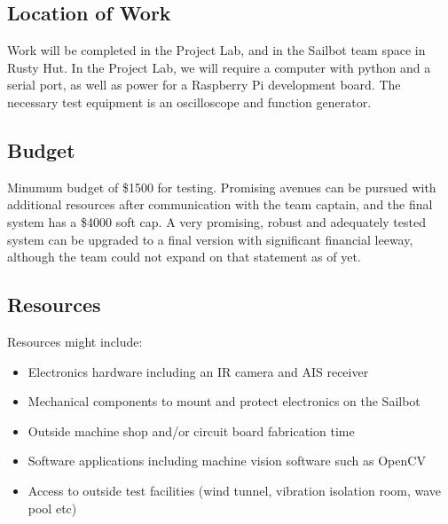 \subsection{\label{sec:resources:location-of-work}Location of Work}
Work will be completed in the Project Lab, and in the Sailbot team space in Rusty Hut. In the Project Lab, we will require a computer with python and a serial port, as well as power for a Raspberry Pi development board. The necessary test equipment is an oscilloscope and function generator.

\subsection{\label{sec:resources:budget}Budget}
Minumum budget of \$1500 for testing. Promising avenues can be pursued with additional resources after communication with the team captain, and the final system has a \$4000 soft cap. A very promising, robust and adequately tested system can be upgraded to a final version with significant financial leeway, although the team could not expand on that statement as of yet. 

\subsection{\label{sec:resources:resources}Resources}
Resources might include:
\begin{itemize}
\item Electronics hardware including an IR camera and AIS receiver
\item Mechanical components to mount and protect electronics on the Sailbot
\item Outside machine shop and/or circuit board fabrication time
\item Software applications including machine vision software such as OpenCV
\item Access to outside test facilities (wind tunnel, vibration isolation room, wave pool etc)
\end{itemize}

